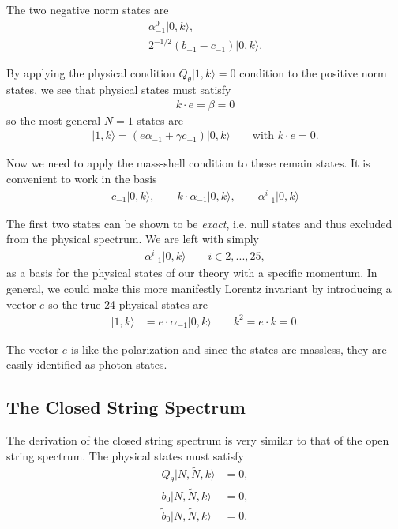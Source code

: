 \documentclass[notitlepage,amsmath,amssymb,aps, pra, 10pt]{revtex4-1}
\begin{document}
        The two negative norm states are
        \begin{align}
            \alpha_{-1} ^ 0 | 0, k\rangle,\\
            2^{-1/2} ( b_{-1} - c_{-1}) | 0, k\rangle.
        \end{align}

        By applying the physical condition $Q_{\theta}| 1, k\rangle = 0$ condition to the positive norm states, we see that physical states must satisfy
        \begin{align}
            k\cdot e = \beta = 0
        \end{align}
        so the most general $N=1$ states are
        \begin{align}
            |1, k\rangle = (e\alpha_{-1} + \gamma c_{-1}) |0, k\rangle \qquad \text{with } k\cdot e = 0.
        \end{align}

        Now we need to apply the mass-shell condition to these remain states. It is convenient to work in the basis
        \begin{align}
            c_{-1}  |0, k\rangle, \qquad k\cdot \alpha_{-1}|0, k\rangle, \qquad  \alpha_{-1}^i|0, k\rangle
        \end{align}

        The first two states can be shown to be \emph{exact}, i.e. null states and thus excluded from the physical spectrum. We are left with simply
        \begin{align}
           \alpha_{-1}^i|0, k\rangle \qquad i\in{2, ..., 25},
        \end{align}
        as a basis for the physical states of our theory with a specific momentum. In general, we could make this more manifestly Lorentz invariant by  introducing a vector $e$ so the true 24 physical states are
        \begin{align}
        |1, k\rangle &= e \cdot \alpha_{-1}|0, k\rangle \qquad k^2 = e\cdot k = 0.
        \end{align}

        The vector $e$ is like the polarization and since the states are massless, they are easily identified as photon states.

    \subsection{The Closed String Spectrum}

        The derivation of the closed string spectrum is very similar to that of the open string spectrum. The physical states must satisfy
        \begin{align}
          Q_{\theta} |N, \tilde N, k\rangle &=0, \\ b_0 |N, \tilde N, k\rangle &=0, \\
          \tilde b_0 |N, \tilde N, k\rangle &=0.
        \end{align}
\end{document}
